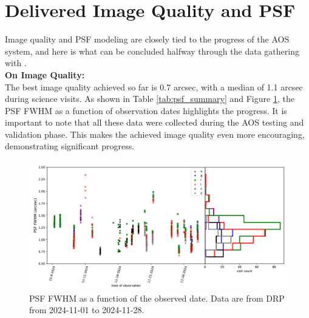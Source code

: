 \section{Delivered Image Quality and PSF}
\label{sec:delivered_image_quality_and_psf}


Image quality and PSF modeling are closely tied to the progress of the AOS system, and here is what can be concluded halfway through the data gathering with \ComCam. \\

\textbf{On Image Quality:} \\

The best image quality achieved so far is 0.7 arcsec, with a median of 1.1 arcsec during science visits. As shown in Table \ref{tab:psf_summary} and Figure \ref{seeing_plot}, the PSF FWHM as a function of observation dates highlights the progress. It is important to note that all these data were collected during the AOS testing and validation phase. This makes the achieved image quality even more encouraging, demonstrating significant progress.

\begin{figure}
        \centering
        \includegraphics[width=\textwidth]{figures/seeing}
        \caption{\small PSF FWHM as a function of the observed date. Data are from DRP from 2024-11-01 to 2024-11-28.}
        \label{seeing_plot}
\end{figure}


